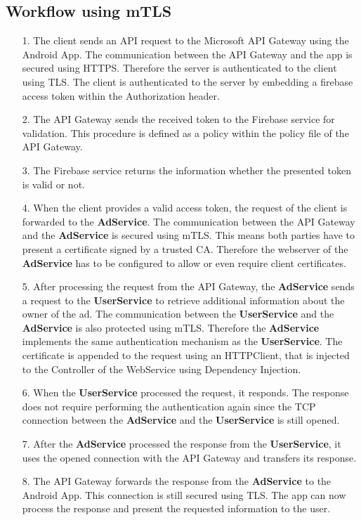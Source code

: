 \subsection{Workflow using mTLS}
\begin{enumerate}
	\item[1.] The client sends an API request to the Microsoft API Gateway using the Android App.
		The communication between the API Gateway and the app is secured using HTTPS.
		Therefore the server is authenticated to the client using TLS.
		The client is authenticated to the server by embedding a firebase access token within the Authorization header.
	\item[2.] The API Gateway sends the received token to the Firebase service for validation.
		This procedure is defined as a policy within the policy file of the API Gateway.
		\newpage
	\item[3.] The Firebase service returns the information whether the presented token is valid or not.
	\item[4.] When the client provides a valid access token, the request of the client is forwarded to the \textbf{AdService}.
		The communication between the API Gateway and the \textbf{AdService} is secured using mTLS.
		This means both parties have to present a certificate signed by a trusted CA.
		Therefore the webserver of the \textbf{AdService} has to be configured to allow or even require client certificates.
	\item[5.] After processing the request from the API Gateway, the \textbf{AdService} sends a request to the \textbf{UserService} to retrieve additional information about the owner of the ad.
		The communication between the \textbf{UserService} and the \textbf{AdService} is also protected using mTLS.
		Therefore the \textbf{AdService} implements the same authentication mechanism as the \textbf{UserService}.
		The certificate is appended to the request using an HTTPClient, that is injected to the Controller of the WebService using Dependency Injection.
	\item[6.] When the \textbf{UserService} processed the request, it responds.
		The response does not require performing the authentication again since the TCP connection between the \textbf{AdService} and the \textbf{UserService} is still opened.
	\item[7.] After the \textbf{AdService} processed the response from the \textbf{UserService}, it uses the opened connection with the API Gateway and transfers its response.
	\item[8.] The API Gateway forwards the response from the \textbf{AdService} to the Android App.
		This connection is still secured using TLS. 
		The app can now process the response and present the requested information to the user.
\end{enumerate}

